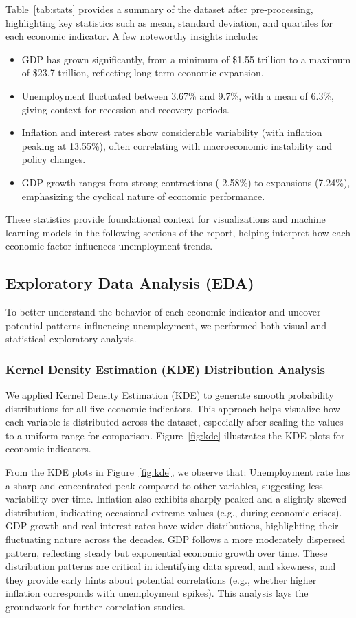 \documentclass[conference]{IEEEtran}
\begin{document}
Table~\ref{tab:stats} provides a summary of the dataset after pre-processing, highlighting key statistics such as mean, standard deviation, and quartiles for each economic indicator. A few noteworthy insights include:
\begin{itemize}
    \item GDP has grown significantly, from a minimum of \$1.55 trillion to a maximum of \$23.7 trillion, reflecting long-term economic expansion.
    \item Unemployment fluctuated between 3.67\% and 9.7\%, with a mean of 6.3\%, giving context for recession and recovery periods.
    \item Inflation and interest rates show considerable variability (with inflation peaking at 13.55\%), often correlating with macroeconomic instability and policy changes.
    \item GDP growth ranges from strong contractions (-2.58\%) to expansions (7.24\%), emphasizing the cyclical nature of economic performance.
\end{itemize}

These statistics provide foundational context for visualizations and machine learning models in the following sections of the report, helping interpret how each economic factor influences unemployment trends.

\subsection{Exploratory Data Analysis (EDA)}

To better understand the behavior of each economic indicator and uncover potential patterns influencing unemployment, we performed both visual and statistical exploratory analysis.

\subsubsection*{Kernel Density Estimation (KDE) \textendash{} Distribution Analysis}
We applied Kernel Density Estimation (KDE) to generate smooth probability distributions for all five economic indicators. This approach helps visualize how each variable is distributed across the dataset, especially after scaling the values to a uniform range for comparison. Figure~\ref{fig:kde} illustrates the KDE plots for economic indicators.

From the KDE plots in Figure~\ref{fig:kde}, we observe that:
Unemployment rate has a sharp and concentrated peak compared to other variables, suggesting less variability over time.
Inflation also exhibits sharply peaked and a slightly skewed distribution, indicating occasional extreme values (e.g., during economic crises).
GDP growth and real interest rates have wider distributions, highlighting their fluctuating nature across the decades.
GDP follows a more moderately dispersed pattern, reflecting steady but exponential economic growth over time.
These distribution patterns are critical in identifying data spread, and skewness, and they provide early hints about potential correlations (e.g., whether higher inflation corresponds with unemployment spikes). This analysis lays the groundwork for further correlation studies.
\end{document}

